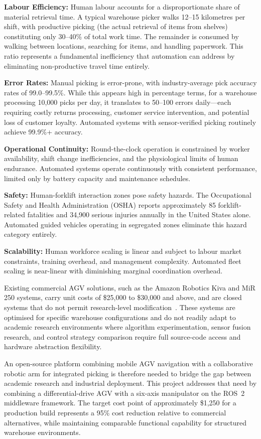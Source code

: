 \documentclass[12pt,a4paper,oneside]{report}
\begin{document}
\textbf{Labour Efficiency:} Human labour accounts for a disproportionate share of material retrieval time. A typical warehouse picker walks 12--15 kilometres per shift, with productive picking (the actual retrieval of items from shelves) constituting only 30--40\% of total work time. The remainder is consumed by walking between locations, searching for items, and handling paperwork. This ratio represents a fundamental inefficiency that automation can address by eliminating non-productive travel time entirely.

\textbf{Error Rates:} Manual picking is error-prone, with industry-average pick accuracy rates of 99.0--99.5\%. While this appears high in percentage terms, for a warehouse processing 10,000 picks per day, it translates to 50--100 errors daily---each requiring costly returns processing, customer service intervention, and potential loss of customer loyalty. Automated systems with sensor-verified picking routinely achieve 99.9\%+ accuracy.

\textbf{Operational Continuity:} Round-the-clock operation is constrained by worker availability, shift change inefficiencies, and the physiological limits of human endurance. Automated systems operate continuously with consistent performance, limited only by battery capacity and maintenance schedules.

\textbf{Safety:} Human-forklift interaction zones pose safety hazards. The Occupational Safety and Health Administration (OSHA) reports approximately 85 forklift-related fatalities and 34,900 serious injuries annually in the United States alone. Automated guided vehicles operating in segregated zones eliminate this hazard category entirely.

\textbf{Scalability:} Human workforce scaling is linear and subject to labour market constraints, training overhead, and management complexity. Automated fleet scaling is near-linear with diminishing marginal coordination overhead.

Existing commercial AGV solutions, such as the Amazon Robotics Kiva and MiR 250 systems, carry unit costs of \$25,000 to \$30,000 and above, and are closed systems that do not permit research-level modification~\cite{azadeh2019}. These systems are optimised for specific warehouse configurations and do not readily adapt to academic research environments where algorithm experimentation, sensor fusion research, and control strategy comparison require full source-code access and hardware abstraction flexibility.

An open-source platform combining mobile AGV navigation with a collaborative robotic arm for integrated picking is therefore needed to bridge the gap between academic research and industrial deployment. This project addresses that need by combining a differential-drive AGV with a six-axis manipulator on the ROS~2 middleware framework. The target cost point of approximately \$1,250 for a production build represents a 95\% cost reduction relative to commercial alternatives, while maintaining comparable functional capability for structured warehouse environments.
\end{document}
